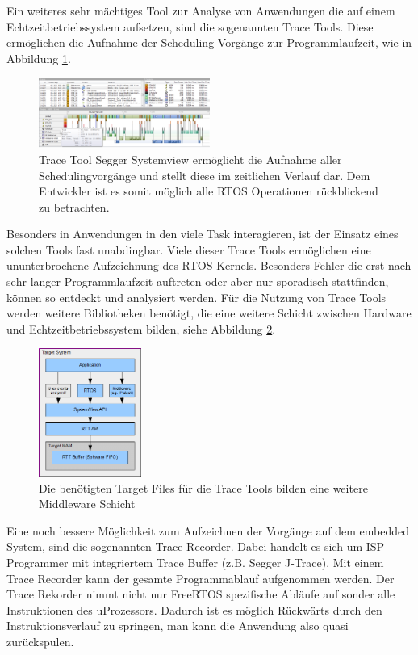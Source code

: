 Ein weiteres sehr mächtiges Tool zur Analyse von Anwendungen die auf einem Echtzeitbetriebssystem aufsetzen, sind die sogenannten Trace Tools. Diese ermöglichen die Aufnahme der Scheduling Vorgänge zur Programmlaufzeit, wie in Abbildung \ref {fig:Systemview}. 
\begin{figure}[htb]
	\centering
		\includegraphics[width=0.5\textwidth]{Pictures/Segger/systemview.png}
	\caption{Trace Tool Segger Systemview ermöglicht die Aufnahme aller Schedulingvorgänge und stellt diese im zeitlichen Verlauf dar. Dem Entwickler ist es somit möglich alle RTOS Operationen rückblickend zu betrachten.}
	\label{fig:Systemview}
\end{figure}
Besonders in Anwendungen in den viele Task interagieren, ist der Einsatz eines solchen Tools fast unabdingbar. Viele dieser Trace Tools ermöglichen eine ununterbrochene Aufzeichnung des RTOS Kernels. Besonders Fehler die erst nach sehr langer Programmlaufzeit auftreten oder aber nur sporadisch stattfinden, können so entdeckt und analysiert werden. Für die Nutzung von Trace Tools werden weitere Bibliotheken benötigt, die eine weitere Schicht zwischen Hardware und Echtzeitbetriebssystem bilden, siehe Abbildung \ref{fig:SystemviewTarget}. 
\begin{figure}[htb]
	\centering
		\includegraphics[width=0.3\textwidth]{Pictures/Segger/SystemViewTarget.png}
	\caption{Die benötigten Target Files für die Trace Tools bilden eine weitere Middleware Schicht }
	\label{fig:SystemviewTarget}
\end{figure}
Eine noch bessere Möglichkeit zum Aufzeichnen der Vorgänge auf dem embedded System, sind die sogenannten Trace Recorder. Dabei handelt es sich um ISP Programmer mit integriertem Trace Buffer (z.B. Segger J-Trace). Mit einem Trace Recorder kann der gesamte Programmablauf aufgenommen werden. Der Trace Rekorder nimmt nicht nur FreeRTOS spezifische Abläufe auf sonder alle Instruktionen des uProzessors. Dadurch ist es möglich Rückwärts durch den Instruktionsverlauf zu springen, man kann die Anwendung also quasi zurückspulen.